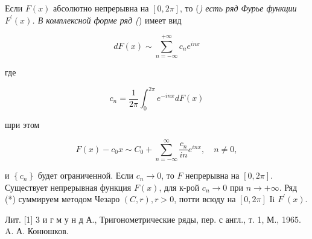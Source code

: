 \documentclass[10pt]{article}
\begin{document}
Если $F(x)$ абсолютно непрерывна на $[0,2 \pi]$, то (\textit{) есть ряд Фурье функции $F^{\prime}(x)$. В комплексной форме ряд (}) имеет вид



\[

d F(x) \sim \sum_{n=-\infty}^{+\infty} c_{n} e^{i n x}

\]



где



\[

c_{n}=\frac{1}{2 \pi} \int_{0}^{2 \pi} e^{-i n x} d F(x)

\]



шри этом



\[

F(x)-c_{0} x \sim C_{0}+\sum_{n=-\infty}^{\infty} \frac{c_{n}}{i n} e^{i n x}, \quad n \neq 0,

\]



и $\left\{c_{n}\right\}$ будет ограниченной. Если $c_{n} \rightarrow 0$, то $F$ непрерывна на $[0,2 \pi]$. Существует непрерывная функция $F(x)$, для к-рой $c_{n} \rightarrow 0$ при $n \longrightarrow+\infty$. Ряд (*) суммируем методом Чезаро $(C, r), r>0$, потти всюду на $[0,2 \pi]$ Ii $F^{\prime}(x)$.



Лит. [1] 3 и г м у н д А., Тригонометрические ряды, пер. с англ., т. 1, М., 1965. A. А. Конюшков.
\end{document}

